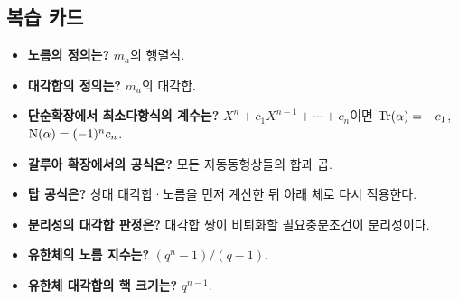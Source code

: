 \subsection*{복습 카드}

\begin{itemize}
  \item \textbf{노름의 정의는?}
  $m_a$의 행렬식.
  \item \textbf{대각합의 정의는?}
  $m_a$의 대각합.
  \item \textbf{단순확장에서 최소다항식의 계수는?}
  $X^n+c_1X^{n-1}+\cdots+c_n$이면
  $\operatorname{Tr}(\alpha)=-c_1$, $\operatorname{N}(\alpha)=(-1)^nc_n$.
  \item \textbf{갈루아 확장에서의 공식은?}
  모든 자동동형상들의 합과 곱.
  \item \textbf{탑 공식은?}
  상대 대각합·노름을 먼저 계산한 뒤 아래 체로 다시 적용한다.
  \item \textbf{분리성의 대각합 판정은?}
  대각합 쌍이 비퇴화할 필요충분조건이 분리성이다.
  \item \textbf{유한체의 노름 지수는?}
  $(q^n-1)/(q-1)$.
  \item \textbf{유한체 대각합의 핵 크기는?}
  $q^{n-1}$.
\end{itemize}
